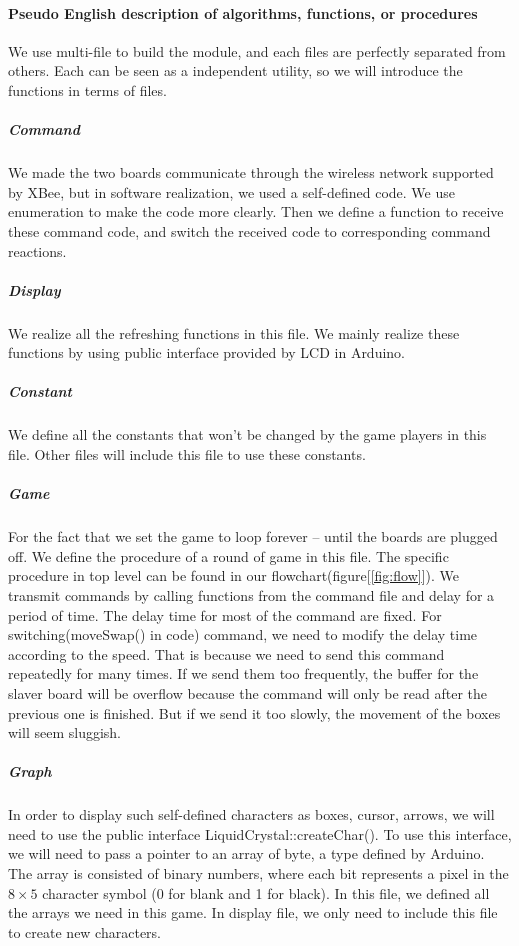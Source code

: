 \paragraph{Pseudo English description of algorithms, functions, or procedures}
\hfill \newline
We use multi-file to build the module, and each files are perfectly separated from others. Each can be seen as a independent utility, so we will introduce the functions in terms of files.

\subparagraph{Command}
\hfill \newline
We made the two boards communicate through the wireless network supported by XBee, but in software realization, we used a self-defined code. We use enumeration to make the code more clearly. Then we define a function to receive these command code, and switch the received code to corresponding command reactions.

\subparagraph{Display}
\hfill \newline
We realize all the refreshing functions in this file. We mainly realize these functions by using public interface provided by LCD in Arduino.

\subparagraph{Constant}
\hfill \newline
We define all the constants that won't be changed by the game players in this file. Other files will include this file to use these constants.

\subparagraph{Game}
\hfill \newline
For the fact that we set the game to loop forever -- until the boards are plugged off. We define the procedure of a round of game in this file. The specific procedure in top level can be found in our flowchart(figure[\ref{fig:flow}]). We transmit commands by calling functions from the command file and delay for a period of time. The delay time for most of the command are fixed. For switching(moveSwap() in code) command, we need to modify the delay time according to the speed. That is because we need to send this command repeatedly for many times. If we send them too frequently, the buffer for the slaver board will be overflow because the command will only be read after the previous one is finished. But if we send it too slowly, the movement of the boxes will seem sluggish.

\subparagraph{Graph}
\hfill \newline
In order to display such self-defined characters as boxes, cursor, arrows, we will need to use the public interface LiquidCrystal::createChar(). To use this interface, we will need to pass a pointer to an array of byte, a type defined by Arduino. The array is consisted of binary numbers, where each bit represents a pixel in the $ 8\times 5 $ character symbol (0 for blank and 1 for black). In this file, we defined all the arrays we need in this game. In display file, we only need to include this file to create new characters.

